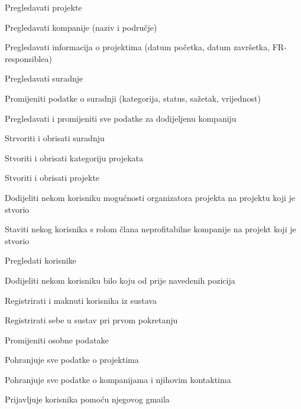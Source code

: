 \begin{packed_enum}
\begin{packed_enum}
				\end{packed_enum}

				\item  {} 

				\begin{packed_enum}

					\item Pregledavati projekte
					\item Pregledavati kompanije (naziv i područje)
					\item Pregledavati informacija o projektima (datum početka, datum završetka, FR-responsiblea)
					\item Pregledavati suradnje
					\item Promijeniti podatke o suradnji (kategorija, status, sažetak, vrijednost)
					\item Pregledavati i promijeniti sve podatke za dodijeljenu kompaniju
					\item Strvoriti i obrisati suradnju
					\item Stvoriti i obrisati kategoriju projekata
					\item Stvoriti i obrisati projekte
					\item Dodijeliti nekom korisniku mogućnosti organizatora projekta na projektu koji je stvorio
					\item Staviti nekog korisnika s rolom člana neprofitabilne kompanije na projekt koji je stvorio
					\item Pregledati korisnike
					\item Dodijeliti nekom korisniku bilo koju od prije navedenih pozicija
					\item Registrirati i maknuti korisnika iz sustava
					\item Registrirati sebe u sustav pri prvom pokretanju
					\item Promijeniti osobne podatake

				\end{packed_enum}
			
				\item  {}
				
				\begin{packed_enum}
					
					\item Pohranjuje sve podatke o projektima
					\item Pohranjuje sve podatke o kompanijama i njihovim kontaktima
					
				\end{packed_enum}

				\item  {}

				\begin{packed_enum}

					\item Prijavljuje korisnika pomoću njegovog gmaila

				\end{packed_enum}
			\end{packed_enum}
			
